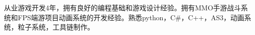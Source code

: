 


\cvself
{从业游戏开发4年，拥有良好的编程基础和游戏设计经验。拥有MMO手游战斗系统和FPS端游项目动画系统的开发经验。熟悉python，C\#，C++，AS3，动画系统，粒子系统，工具链制作。}
